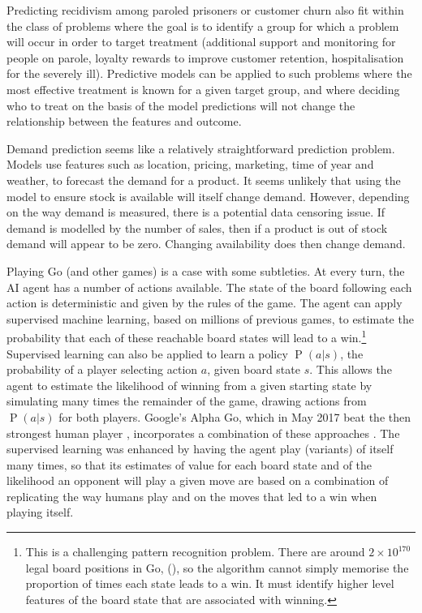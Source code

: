 \documentclass[11pt,a4paper,twoside]{report}
\renewcommand{\P}[1]{\operatorname{P}\left(#1\right)}
\theoremstyle{plain}
\theoremstyle{definition}
\begin{document}
Predicting recidivism among paroled prisoners or customer churn also fit within the class of problems where the goal is to identify a group for which a problem will occur in order to target treatment (additional support and monitoring for people on parole, loyalty rewards to improve customer retention, hospitalisation for the severely ill). Predictive models can be applied to such problems where the most effective treatment is known for a given target group, and where deciding who to treat on the basis of the model predictions will not change the relationship between the features and outcome.

Demand prediction seems like a relatively straightforward prediction problem. Models use features such as location, pricing, marketing, time of year and weather, to forecast the demand for a product. It seems unlikely that using the model to ensure stock is available will itself change demand. However, depending on the way demand is measured, there is a potential data censoring issue. If demand is modelled by the number of sales, then if a product is out of stock demand will appear to be zero. Changing availability does then change demand.
   
Playing Go (and other games) is a case with some subtleties. At every turn, the AI agent has a number of actions available. The state of the board following each action is deterministic and given by the rules of the game. The agent can apply supervised machine learning, based on millions of previous games, to estimate the probability that each of these reachable board states will lead to a win.\footnote{This is a challenging pattern recognition problem. There are around $2 \times 10^{170}$ legal board positions in Go, (\citep{tromp2016number}), so the algorithm cannot simply memorise the proportion of times each state leads to a win. It must identify higher level features of the board state that are associated with winning.} Supervised learning can also be applied to learn a policy $\P{a|s}$, the probability of a player selecting action $a$, given board state $s$. This allows the agent to estimate the likelihood of winning from a given starting state by simulating many times the remainder of the game, drawing actions from $\P{a|s}$ for both players. Google's Alpha Go, which in May 2017 beat the then strongest human player \citep{Mozur2017}, incorporates a combination of these approaches \citep{silver2016mastering}. The supervised learning was enhanced by having the agent play (variants) of itself many times, so that its estimates of value for each board state and of the likelihood an opponent will play a given move are based on a combination of replicating the way humans play and on the moves that led to a win when playing itself. 
\end{document}
